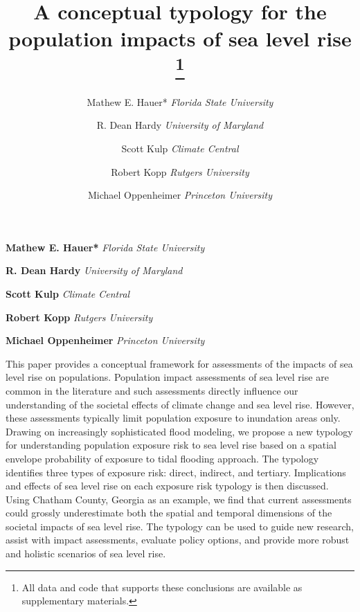 \documentclass[12pt,]{article}
\title{A conceptual typology for the population impacts of sea level rise \thanks{All data and code that supports these conclusions are available as
supplementary materials.}  }
\author{\Large Mathew E. Hauer*\vspace{0.05in} \newline\normalsize\emph{Florida State University}   \and \Large R. Dean Hardy\vspace{0.05in} \newline\normalsize\emph{University of Maryland}   \and \Large Scott Kulp\vspace{0.05in} \newline\normalsize\emph{Climate Central}   \and \Large Robert Kopp\vspace{0.05in} \newline\normalsize\emph{Rutgers University}   \and \Large Michael Oppenheimer\vspace{0.05in} \newline\normalsize\emph{Princeton University}  }
\date{}
\newcommand*{\authorfont}{\fontfamily{phv}\selectfont}
\renewenvironment{abstract}
 {{%
    \setlength{\leftmargin}{0mm}
    \setlength{\rightmargin}{\leftmargin}%
  }%
  \relax}
 {\endlist}
\begin{document}
	
%

{%
\setlength{\parindent}{0pt}
\thispagestyle{plain}
{\fontsize{18}{20}\selectfont\raggedright 
\maketitle  %

}

{
   \vskip 13.5pt\relax \normalsize\fontsize{11}{12} 
\textbf{\authorfont Mathew E. Hauer*} \hskip 15pt \emph{\small Florida State University}   \par \textbf{\authorfont R. Dean Hardy} \hskip 15pt \emph{\small University of Maryland}   \par \textbf{\authorfont Scott Kulp} \hskip 15pt \emph{\small Climate Central}   \par \textbf{\authorfont Robert Kopp} \hskip 15pt \emph{\small Rutgers University}   \par \textbf{\authorfont Michael Oppenheimer} \hskip 15pt \emph{\small Princeton University}   

}

}








\begin{abstract}

    \hbox{\vrule height .2pt width 39.14pc}

    \vskip 8.5pt %

\noindent This paper provides a conceptual framework for assessments of the
impacts of sea level rise on populations. Population impact assessments
of sea level rise are common in the literature and such assessments
directly influence our understanding of the societal effects of climate
change and sea level rise. However, these assessments typically limit
population exposure to inundation areas only. Drawing on increasingly
sophisticated flood modeling, we propose a new typology for
understanding population exposure risk to sea level rise based on a
spatial envelope probability of exposure to tidal flooding approach. The
typology identifies three types of exposure risk: direct, indirect, and
tertiary. Implications and effects of sea level rise on each exposure
risk typology is then discussed. Using Chatham County, Georgia as an
example, we find that current assessments could grossly underestimate
both the spatial and temporal dimensions of the societal impacts of sea
level rise. The typology can be used to guide new research, assist with
impact assessments, evaluate policy options, and provide more robust and
holistic scenarios of sea level rise.


    \hbox{\vrule height .2pt width 39.14pc}


\end{abstract}
\end{document}
